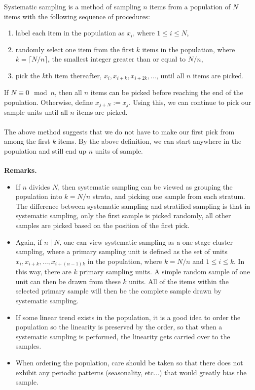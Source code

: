 \documentclass[12pt]{article}
\begin{document}
Systematic sampling is a method of sampling $n$ items from a
population of $N$ items with the following sequence of procedures:
\begin{enumerate}
\item label each item in the population as $x_i$, where $1\leq i\leq
N$,
\item randomly select one item from the first $k$ items in the
population, where $k=\lceil N/n \rceil$, the smallest integer
greater than or equal to $N/n$,
\item pick the $k$th item thereafter, $x_i,x_{i+k},x_{i+2k},\ldots$,
until all $n$ items are picked.
\end{enumerate}
If $N\equiv0 \mod n$, then all $n$ items can be picked before
reaching the end of the population.  Otherwise, define
$x_{j+N}:=x_j$.  Using this, we can continue to pick our sample
units until all $n$ items are picked.
\\\\
The above method suggests that we do not have to make our first pick
from among the first $k$ items.  By the above definition, we can
start anywhere in the population and still end up $n$ units of
sample.
\\\\
\textbf{Remarks.}
\begin{itemize}
\item If $n$ divides $N$, then systematic sampling can be viewed as
grouping the population into $k=N/n$ strata, and picking one sample
from each stratum.  The difference between systematic sampling and
stratified sampling is that in systematic sampling, only the first
sample is picked randomly, all other samples are picked based on the
position of the first pick.
\item Again, if $n\mid N$, one can view systematic sampling as a
one-stage cluster sampling, where a primary sampling unit is defined
as the set of units $x_i,x_{i+k},\ldots,x_{i+(n-1)k}$ in the
population, where $k=N/n$ and $1\leq i\leq k$.  In this way, there
are $k$ primary sampling units.  A simple random sample of one unit
can then be drawn from these $k$ units.  All of the items within the
selected primary sample will then be the complete sample drawn by
systematic sampling.
\item If some linear trend exists in the population, it is a good
idea to order the population so the linearity is preserved by the
order, so that when a systematic sampling is performed, the
linearity gets carried over to the samples.
\item When ordering the population, care should be taken so that there
does not exhibit any periodic patterns (seasonality, etc...) that
would greatly bias the sample.
\end{itemize}
\end{document}
